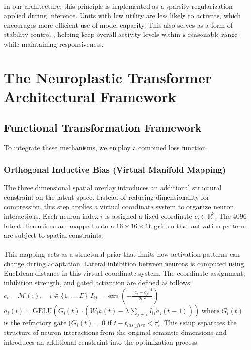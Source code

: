 \documentclass[11pt, letterpaper]{article}
\begin{document}
\paragraph{}
In our architecture, this principle is implemented as a sparsity regularization applied during inference. Units with low utility are less likely to activate, which encourages more efficient use of model capacity. This also serves as a form of stability control \cite{homeostatic}, helping keep overall activity levels within a reasonable range while maintaining responsiveness.

\section{The Neuroplastic Transformer Architectural Framework}
\subsection{Functional Transformation Framework} To integrate these mechanisms, we employ a combined loss function.

\subsubsection{Orthogonal Inductive Bias (Virtual Manifold Mapping)}
The three dimensional spatial overlay introduces an additional structural constraint on the latent space. Instead of reducing dimensionality for compression, this step applies a virtual coordinate system to organize neuron interactions. Each neuron index $i$ is assigned a fixed coordinate $c_i \in \mathbb{R}^3$. The 4096 latent dimensions are mapped onto a $16 \times 16 \times 16$ grid so that activation patterns are subject to spatial constraints.

\paragraph{}
This mapping acts as a structural prior that limits how activation patterns can change during adaptation. Lateral inhibition between neurons is computed using Euclidean distance in this virtual coordinate system. The coordinate assignment, inhibition strength, and gated activation are defined as follows:
$c_i = \mathcal{M}(i), \quad i \in \{1, \dots, D\}$
$I_{ij} = \exp\left(-\frac{||c_i - c_j||^2}{2\sigma^2}\right)$
$a_i(t) = \text{GELU}\left(G_i(t) \cdot (W_i h(t) - \lambda \sum_{j \neq i} I_{ij} a_j(t-1))\right)$
where $G_i(t)$ is the refractory gate ($G_i(t)=0$ if $t - t_{last\_fire} < \tau$). This setup separates the structure of neuron interactions from the original semantic dimensions and introduces an additional constraint into the optimization process.
\end{document}
